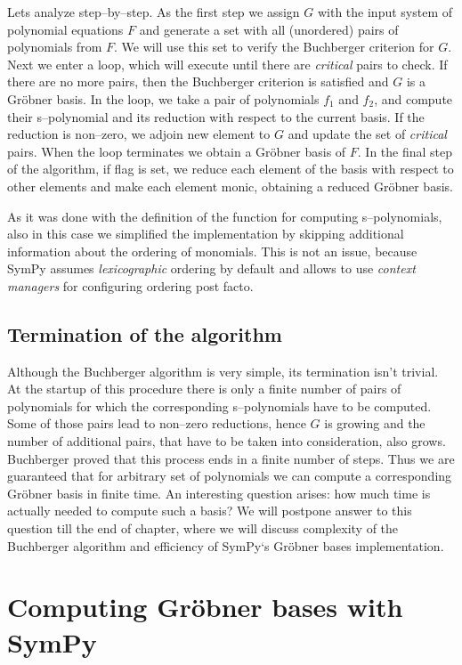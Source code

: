 \noindent
Lets analyze  step--by--step. As the first step we assign $G$ with the input
system of polynomial equations $F$ and generate a set with all (unordered) pairs of polynomials
from $F$. We will use this set to verify the Buchberger criterion for $G$. Next we enter a loop,
which will execute until there are \emph{critical} pairs to check. If there are no more pairs, then
the Buchberger criterion is satisfied and $G$ is a Gröbner basis. In the loop, we take a pair
of polynomials $f_1$ and $f_2$, and compute their s--polynomial and its reduction with respect
to the current basis. If the reduction is non--zero, we adjoin new element to $G$ and update
the set of \emph{critical} pairs. When the loop terminates we obtain a Gröbner basis of $F$. In
the final step of the algorithm, if  flag is set, we reduce each element of the basis
with respect to other elements and make each element monic, obtaining a reduced Gröbner basis.

As it was done with the definition of the function for computing s--polynomials, also in this case
we simplified the implementation by skipping additional information about the ordering of monomials.
This is not an issue, because SymPy assumes \emph{lexicographic} ordering by default and allows to use
\emph{context managers} for configuring ordering post facto.


\subsection{Termination of the algorithm}

Although the Buchberger algorithm is very simple, its termination isn't trivial. At the startup
of this procedure there is only a finite number of pairs of polynomials for which the corresponding
s--polynomials have to be computed. Some of those pairs lead to non--zero reductions, hence $G$ is
growing and the number of additional pairs, that have to be taken into consideration, also grows.
Buchberger proved that this process ends in a finite number of steps. Thus we are guaranteed that
for arbitrary set of polynomials we can compute a corresponding Gröbner basis in finite time.
An interesting question arises: how much time is actually needed to compute such a basis? We will
postpone answer to this question till the end of chapter, where we will discuss complexity of the
Buchberger algorithm and efficiency of SymPy`s Gröbner bases implementation.


\section{Computing Gröbner bases with SymPy}

